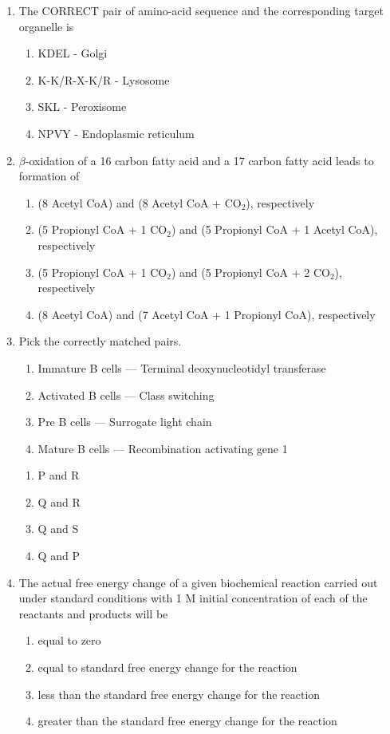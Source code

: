 \documentclass[journal,12pt,onecolumn]{IEEEtran}
\begin{document}
\begin{enumerate}[label=\arabic*.]
\item The CORRECT pair of amino-acid sequence and the corresponding target organelle is
\begin{multicols}{2}
\begin{enumerate}[label=(\Alph*)]
\item KDEL - Golgi
\item K-K/R-X-K/R - Lysosome
\item SKL - Peroxisome
\item NPVY - Endoplasmic reticulum
\end{enumerate}
\end{multicols}

\item $\beta$-oxidation of a 16 carbon fatty acid and a 17 carbon fatty acid leads to formation of
\begin{enumerate}[label=(\Alph*)]
\item (8 Acetyl CoA) and (8 Acetyl CoA + CO$_2$), respectively
\item (5 Propionyl CoA + 1 CO$_2$) and (5 Propionyl CoA + 1 Acetyl CoA), respectively
\item (5 Propionyl CoA + 1 CO$_2$) and (5 Propionyl CoA + 2 CO$_2$), respectively
\item (8 Acetyl CoA) and (7 Acetyl CoA + 1 Propionyl CoA), respectively
\end{enumerate}


\item Pick the correctly matched pairs.
\begin{enumerate}[label=\Alph*. ,start=16]
\item Immature B cells — Terminal deoxynucleotidyl transferase
\item Activated B cells — Class switching
\item Pre B cells       — Surrogate light chain
\item Mature B cells   — Recombination activating gene 1
\end{enumerate}
\begin{multicols}{4}
\begin{enumerate}[label=(\Alph*)]
\item P and R
\item Q and R
\item Q and S
\item Q and P
\end{enumerate}
\end{multicols}

\item The actual free energy change of a given biochemical reaction carried out under standard conditions with 1 M initial concentration of each of the reactants and products will be
\begin{enumerate}[label=(\Alph*)]
\item equal to zero
\item equal to standard free energy change for the reaction
\item less than the standard free energy change for the reaction
\item greater than the standard free energy change for the reaction
\end{enumerate}


\end{enumerate}
\end{document}
